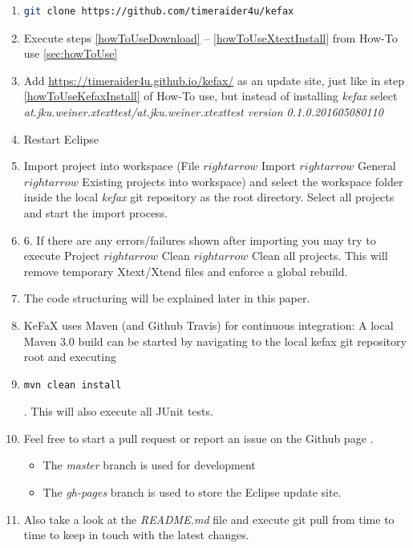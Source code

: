 \begin{enumerate}
 \item \begin{lstlisting}[language=Bash,breaklines=true,]
        git clone https://github.com/timeraider4u/kefax
       \end{lstlisting}
 \item Execute steps \ref{howToUseDownload} -- \ref{howToUseXtextInstall} from How-To use \ref{sec:howToUse}
 \item Add \url{https://timeraider4u.github.io/kefax/}\cite{Kefax_URL} as an update site, 
 just like in step \ref{howToUseKefaxInstall} of How-To use, but instead of installing {\it kefax} 
 select {\it at.jku.weiner.xtexttest/at.jku.weiner.xtexttest version 0.1.0.201605080110}
 \item Restart Eclipse
 \item Import project into workspace (File $rightarrow$ Import $rightarrow$ General $rightarrow$ 
 Existing projects into workspace) and select the workspace folder inside the local {\it kefax}
 git repository as the root directory. Select all projects and start the import process.
 \item 6. If there are any errors/failures shown after importing you may try to execute 
 Project $rightarrow$ Clean $rightarrow$ Clean all projects.
 This will remove temporary Xtext/Xtend files and enforce a global rebuild.
 \item The code structuring will be explained later in this paper. 
 \item KeFaX uses Maven (and Github Travis) for continuous integration:
 A local Maven 3.0 build can be started by navigating to the local kefax git repository root and executing 
 \item \begin{lstlisting}[language=Bash,breaklines=true,]
 mvn clean install
 \end{lstlisting}. This will also execute all JUnit tests.
 \item Feel free to start a pull request or report an issue on the Github page \cite{Kefax2_URL}.
  \begin{itemize}
   \item The {\it master} branch is used for development
   \item The {\it gh-pages} branch is used to store the Eclipse update site. 
  \end{itemize}
 \item Also take a look at the {\it README.md} file 
 and execute git pull from time to time to keep in touch with the latest changes. 
\end{enumerate}
